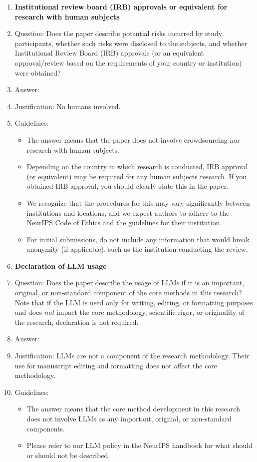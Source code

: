 \documentclass{article}
\theoremstyle{plain}
\theoremstyle{definition}
\theoremstyle{remark}
\begin{document}
\begin{enumerate}
\item {\bf Institutional review board (IRB) approvals or equivalent for research with human subjects}
    \item[] Question: Does the paper describe potential risks incurred by study participants, whether such risks were disclosed to the subjects, and whether Institutional Review Board (IRB) approvals (or an equivalent approval/review based on the requirements of your country or institution) were obtained?
    \item[] Answer: \answerNA{} %
    \item[] Justification: No humans involved.
    \item[] Guidelines:
    \begin{itemize}
        \item The answer \answerNA{} means that the paper does not involve crowdsourcing nor research with human subjects.
        \item Depending on the country in which research is conducted, IRB approval (or equivalent) may be required for any human subjects research. If you obtained IRB approval, you should clearly state this in the paper. 
        \item We recognize that the procedures for this may vary significantly between institutions and locations, and we expect authors to adhere to the NeurIPS Code of Ethics and the guidelines for their institution. 
        \item For initial submissions, do not include any information that would break anonymity (if applicable), such as the institution conducting the review.
    \end{itemize}

\item {\bf Declaration of LLM usage}
    \item[] Question: Does the paper describe the usage of LLMs if it is an important, original, or non-standard component of the core methods in this research? Note that if the LLM is used only for writing, editing, or formatting purposes and does \emph{not} impact the core methodology, scientific rigor, or originality of the research, declaration is not required.
    \item[] Answer: \answerNA{} %
    \item[] Justification: LLMs are not a component of the research methodology. Their use for manuscript editing and formatting does not affect the core methodology.
    \item[] Guidelines:
    \begin{itemize}
        \item The answer \answerNA{} means that the core method development in this research does not involve LLMs as any important, original, or non-standard components.
        \item Please refer to our LLM policy in the NeurIPS handbook for what should or should not be described.
    \end{itemize}

\end{enumerate}
\end{document}
